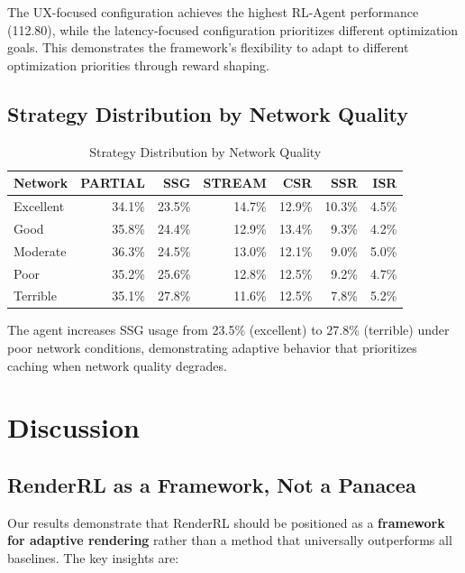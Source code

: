 \documentclass[10pt,twocolumn]{article}
\newcommand{\method}{RenderRL}
\begin{document}
The UX-focused configuration achieves the highest RL-Agent performance (112.80), while the latency-focused configuration prioritizes different optimization goals. This demonstrates the framework's flexibility to adapt to different optimization priorities through reward shaping.

\subsection{Strategy Distribution by Network Quality}

\begin{table}[t]
\centering
\caption{Strategy Distribution by Network Quality}
\label{tab:stratnet}
\small
\begin{tabular}{lrrrrrr}
\toprule
\textbf{Network} & \textbf{PARTIAL} & \textbf{SSG} & \textbf{STREAM} & \textbf{CSR} & \textbf{SSR} & \textbf{ISR} \\
\midrule
Excellent & 34.1\% & 23.5\% & 14.7\% & 12.9\% & 10.3\% & 4.5\% \\
Good & 35.8\% & 24.4\% & 12.9\% & 13.4\% & 9.3\% & 4.2\% \\
Moderate & 36.3\% & 24.5\% & 13.0\% & 12.1\% & 9.0\% & 5.0\% \\
Poor & 35.2\% & 25.6\% & 12.8\% & 12.5\% & 9.2\% & 4.7\% \\
Terrible & 35.1\% & 27.8\% & 11.6\% & 12.5\% & 7.8\% & 5.2\% \\
\bottomrule
\end{tabular}
\end{table}

The agent increases SSG usage from 23.5\% (excellent) to 27.8\% (terrible) under poor network conditions, demonstrating adaptive behavior that prioritizes caching when network quality degrades.

\section{Discussion}
\label{sec:discussion}

\subsection{\method{} as a Framework, Not a Panacea}

Our results demonstrate that \method{} should be positioned as a \textbf{framework for adaptive rendering} rather than a method that universally outperforms all baselines. The key insights are:
\end{document}
